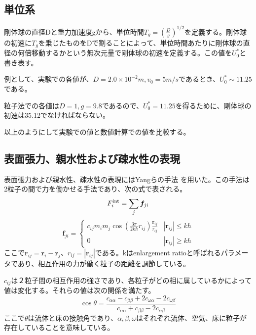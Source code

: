 \documentclass[]{jsarticle}
\begin{document}
\subsection{単位系}
剛体球の直径Dと重力加速度gから、単位時間$T_g=(\frac{D}{g})^{1/2}$を定義する。剛体球の初速に$T_g$を乗じたものをDで割ることによって、単位時間あたりに剛体球の直径の何倍移動するかという無次元量で剛体球の初速を定義する。この値を$U_0^*$と書き表す。

例として、実験での各値が、$D=2.0\times10^{-2}m,v_0=5m/s$であるとき、$U_0^*\sim11.25$である。

粒子法での各値は$D=1, g=9.8$であるので、$U_0^*=11.25$を得るために、剛体球の初速は35.12でなければならない。

以上のようにして実験での値と数値計算での値を比較する。




\subsection{表面張力、親水性および疎水性の表現}
表面張力および親水性、疎水性の表現にはYangらの手法 \cite{Yang2017}を用いた。この手法は2粒子の間で力を働かせる手法であり、次の式で表される。
\begin{equation}
F^{\rm{int}}_i=\sum_{j} \bm{f}_{ji}
\end{equation}
\begin{equation}
  \bm{f}_{ji}=\begin{cases}
    c_{ij}m_im_j\cos(\frac{3\pi}{2kh}r_{ij})\frac{\bm{r}_{ij}}{r_{ij}} & \text{$|\bm{r}_{ij}|\leq kh$}\\
    0 & \text{$|\bm{r}_{ij}|\geq kh$}
\end{cases}
\end{equation}
ここで$\bm{r}_{ij}=\bm{r}_i-\bm{r}_{j}$、$r_{ij}=|\bm{r}_{ij}|$である。kはenlargement ratioと呼ばれるパラメータであり、相互作用の力が働く粒子の距離を調節している。

$c_{ij}$は２粒子間の相互作用の強さであり、各粒子がどの相に属しているかによって値は変化する。それらの値は次の関係を満たす。
\begin{equation}
\cos\theta=\frac{c_{\alpha\alpha}-c_{\beta\beta}+2c_{\omega\alpha}-2c_{\omega\beta}}{c_{\alpha\alpha} +c_{\beta\beta} -2c_{\alpha\beta}}
\end{equation}
ここで$\theta$は流体と床の接触角であり、$\alpha,\beta,\omega$はそれぞれ流体、空気、床に粒子が存在していることを意味している。
\end{document}
